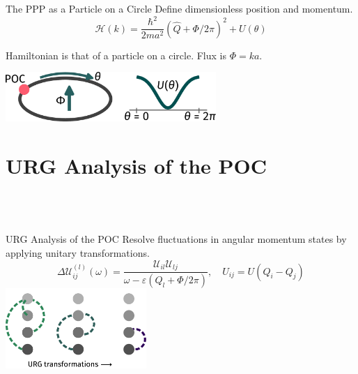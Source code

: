 \documentclass[aspectratio=169,t]{beamer}
\begin{document}
\begin{frame}{The PPP as a Particle on a Circle}
	Define dimensionless position and momentum.
	\[\mathcal{H}(k) = \frac{\hbar^2}{2ma^2}\left(\hat Q + \Phi/2\pi\right)^2 + U(\theta)\]

	\vspace*{\fill}
	Hamiltonian is that of a \alert{particle on a circle}. Flux is \(\Phi = ka\).

	\vspace*{\fill}
	\includegraphics[width=0.6\textwidth]{POC.pdf}
\end{frame}

\section{URG Analysis of the POC}
\subsection{~}

\begin{frame}{URG Analysis of the POC}
	\alert{Resolve fluctuations} in angular momentum states by applying unitary transformations.
	\[\Delta \mathcal{U}_{ij}^{(l)}(\omega) = \frac{\mathcal{U}_{il}\mathcal{U}_{lj}}{\omega - \varepsilon(Q_l + \Phi/2\pi)},\quad U_{ij} = U(Q_i - Q_j)\]
	\includegraphics[width=0.4\textwidth]{URG_poc.pdf}
\end{frame}
\end{document}
